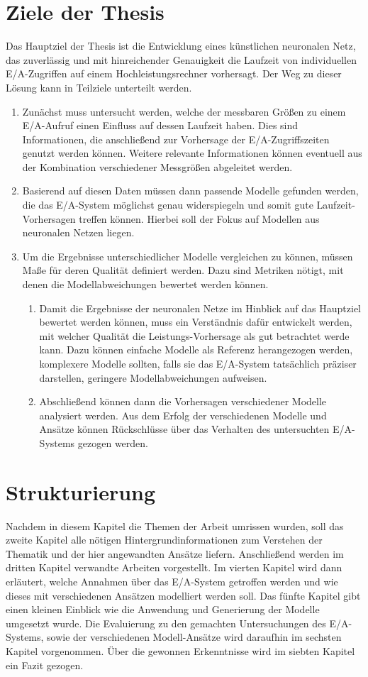 \documentclass[
	12pt,
	a4paper,
	BCOR10mm,
	DIV14,
	listof=totoc,
	bibliography=totoc,
	headsepline
]{scrreprt}
\begin{document}
\section{Ziele der Thesis}
Das Hauptziel der Thesis ist die Entwicklung eines künstlichen neuronalen Netz, das zuverlässig und mit hinreichender Genauigkeit die Laufzeit von individuellen E/A-Zugriffen auf einem Hochleistungsrechner vorhersagt. 
Der Weg zu dieser Lösung kann in Teilziele unterteilt werden.
\begin{enumerate}
	\item Zunächst muss untersucht werden, welche der messbaren Größen zu einem E/A-Aufruf einen Einfluss auf dessen Laufzeit haben. Dies sind Informationen, die anschließend zur Vorhersage der E/A-Zugriffszeiten genutzt werden können.
	Weitere relevante Informationen können eventuell aus der Kombination verschiedener Messgrößen abgeleitet werden.
	\item Basierend auf diesen Daten müssen dann passende Modelle gefunden werden, die das E/A-System möglichst genau widerspiegeln und somit gute Laufzeit-Vorhersagen treffen können. Hierbei soll der Fokus auf Modellen aus neuronalen Netzen liegen.
	\item Um die Ergebnisse unterschiedlicher Modelle vergleichen zu können, müssen Maße für deren Qualität definiert werden. Dazu sind Metriken nötigt, mit denen die Modellabweichungen bewertet werden können.
	\begin{enumerate}
		\item Damit die Ergebnisse der neuronalen Netze im Hinblick auf das Hauptziel bewertet werden können, muss ein Verständnis dafür entwickelt werden, mit welcher Qualität die Leistungs-Vorhersage als gut betrachtet werde kann.
		Dazu können einfache Modelle als Referenz herangezogen werden, komplexere Modelle sollten, falls sie das E/A-System tatsächlich präziser darstellen, geringere Modellabweichungen aufweisen.
		\item Abschließend können dann die Vorhersagen verschiedener Modelle analysiert werden. Aus dem Erfolg der verschiedenen Modelle und Ansätze können Rückschlüsse über das Verhalten des untersuchten E/A-Systems gezogen werden.
	\end{enumerate}
\end{enumerate}

\section{Strukturierung}
Nachdem in diesem Kapitel die Themen der Arbeit umrissen wurden, soll das zweite Kapitel alle nötigen Hintergrundinformationen zum Verstehen der Thematik und der hier angewandten Ansätze liefern. Anschließend werden im dritten Kapitel verwandte Arbeiten vorgestellt.
Im vierten Kapitel wird dann erläutert, welche Annahmen über das E/A-System getroffen werden und wie dieses mit verschiedenen Ansätzen modelliert werden soll.
Das fünfte Kapitel gibt einen kleinen Einblick wie die Anwendung und Generierung der Modelle umgesetzt wurde.
Die Evaluierung zu den gemachten Untersuchungen des E/A-Systems, sowie der verschiedenen Modell-Ansätze wird daraufhin im sechsten Kapitel vorgenommen.
Über die gewonnen Erkenntnisse wird im siebten Kapitel ein Fazit gezogen.
\bigskip
\end{document}

